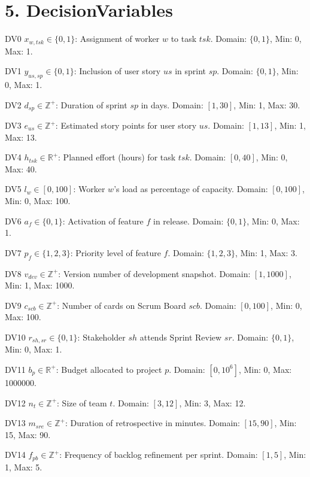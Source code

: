 \documentclass[11pt]{article}
\begin{document}
\section{5. DecisionVariables}
\item[DV0] $x_{w,tsk} \in \{0,1\}$: Assignment of worker $w$ to task $tsk$. Domain: $\{0,1\}$, Min: 0, Max: 1.
    \item[DV1] $y_{us,sp} \in \{0,1\}$: Inclusion of user story $us$ in sprint $sp$. Domain: $\{0,1\}$, Min: 0, Max: 1.
    \item[DV2] $d_{sp} \in \mathbb{Z}^+$: Duration of sprint $sp$ in days. Domain: $[1,30]$, Min: 1, Max: 30.
    \item[DV3] $e_{us} \in \mathbb{Z}^+$: Estimated story points for user story $us$. Domain: $[1,13]$, Min: 1, Max: 13.
    \item[DV4] $h_{tsk} \in \mathbb{R}^+$: Planned effort (hours) for task $tsk$. Domain: $[0,40]$, Min: 0, Max: 40.
    \item[DV5] $l_w \in [0,100]$: Worker $w$'s load as percentage of capacity. Domain: $[0,100]$, Min: 0, Max: 100.
    \item[DV6] $a_f \in \{0,1\}$: Activation of feature $f$ in release. Domain: $\{0,1\}$, Min: 0, Max: 1.
    \item[DV7] $p_f \in \{1,2,3\}$: Priority level of feature $f$. Domain: $\{1,2,3\}$, Min: 1, Max: 3.
    \item[DV8] $v_{dev} \in \mathbb{Z}^+$: Version number of development snapshot. Domain: $[1,1000]$, Min: 1, Max: 1000.
    \item[DV9] $c_{scb} \in \mathbb{Z}^+$: Number of cards on Scrum Board $scb$. Domain: $[0,100]$, Min: 0, Max: 100.
    \item[DV10] $r_{sh,sr} \in \{0,1\}$: Stakeholder $sh$ attends Sprint Review $sr$. Domain: $\{0,1\}$, Min: 0, Max: 1.
    \item[DV11] $b_p \in \mathbb{R}^+$: Budget allocated to project $p$. Domain: $[0,10^6]$, Min: 0, Max: 1000000.
    \item[DV12] $n_t \in \mathbb{Z}^+$: Size of team $t$. Domain: $[3,12]$, Min: 3, Max: 12.
    \item[DV13] $m_{sre} \in \mathbb{Z}^+$: Duration of retrospective in minutes. Domain: $[15,90]$, Min: 15, Max: 90.
    \item[DV14] $f_{pb} \in \mathbb{Z}^+$: Frequency of backlog refinement per sprint. Domain: $[1,5]$, Min: 1, Max: 5.
\end{document}

